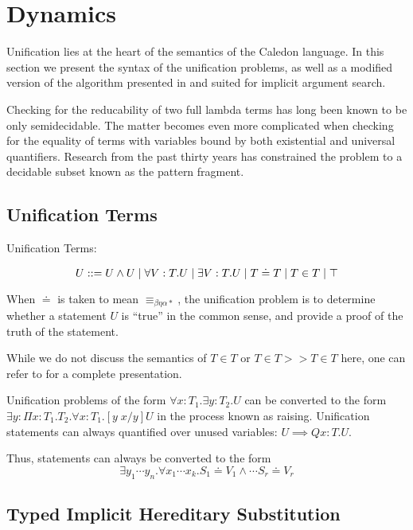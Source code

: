 \section{Dynamics}

Unification lies at the heart of the semantics of the Caledon language.  
In this section we present the syntax of the unification problems, as well as a modified version of the algorithm 
presented in \citep{pfenning1991logic} and \citep{pfenning1991unification} suited for implicit argument search.

Checking for the reducability of two full lambda terms has long been known to be only semidecidable.  
The matter becomes even more complicated when checking for the equality of terms with variables bound
by both existential and universal quantifiers.  Research from the past thirty years has constrained
the problem to a decidable subset known as the pattern fragment.

\subsection{Unification Terms}

\begin{definition}
Unification Terms:

\[
U ::= U \wedge U 
 \; | \; \forall V : T . U
 \; | \; \exists V : T . U 
 \; | \; T \doteq T
 \; | \; T \in T
 \; | \; \top
\]
\label{def:hou:syn}
\end{definition}

When $\doteq$ is taken to mean $\equiv_{\beta\eta\alpha*}$, the unification problem is to determine 
whether a statement $U$ is ``true'' in the common sense, and provide a proof of the truth of the statement. 

While we do not discuss the semantics of $T \in T$ or $T \in T >> T \in T$ here, 
one can refer to \citep{pfenning1991logic} for a complete presentation.

Unification problems of the form 
$\forall x : T_1 . \exists y : T_2 . U $ can be converted to the form
$\exists y : \Pi x : T_1 . T_2 . \forall x : T_1 . [y\; x / y ]U $ 
in the process known as raising. Unification
statements can always quantified over unused variables: $U \implies Q x : T . U$.  

Thus, statements can always be converted to the form
\[
\exists y_1 \cdots y_n . \forall x_1 \cdots x_k . S_1 \doteq V_1 \wedge \cdots S_r \doteq V_r
\]

\subsection{Typed Implicit Hereditary Substitution}

